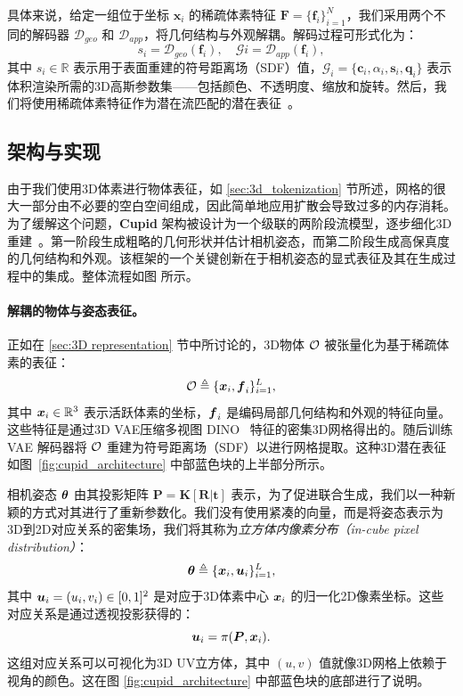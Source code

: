 \documentclass[../../book-main_zh.tex]{subfiles}
\begin{document}
具体来说，给定一组位于坐标 $\boldsymbol{x}_i$ 的稀疏体素特征 $\boldsymbol{F} = \{\boldsymbol{f}_i\}_{i=1}^N$，我们采用两个不同的解码器 $\mathcal{D}_{geo}$ 和 $\mathcal{D}_{app}$，将几何结构与外观解耦。解码过程可形式化为：
\begin{equation}
s_i = \mathcal{D}_{geo}(\boldsymbol{f}_i), \quad \mathcal{G}i = \mathcal{D}_{app}(\boldsymbol{f}_i),
\end{equation}
其中 $s_i \in \mathbb{R}$ 表示用于表面重建的符号距离场（SDF）值，$\mathcal{G}_i = \{\boldsymbol{c}_i, \alpha_i, \boldsymbol{s}_i, \boldsymbol{q}_i\}$ 表示体积渲染所需的3D高斯参数集——包括颜色、不透明度、缩放和旋转。然后，我们将使用稀疏体素特征作为潜在流匹配的潜在表征~\citep{rombach2022high}。

\subsection{架构与实现}
\label{sub:3d_reconstruction_architecture}
由于我们使用3D体素进行物体表征，如 \ref{sec:3d_tokenization} 节所述，网格的很大一部分由不必要的空白空间组成，因此简单地应用扩散会导致过多的内存消耗。为了缓解这个问题，\textbf{Cupid} 架构被设计为一个级联的两阶段流模型，逐步细化3D重建~\citep{xiang2025structured}。第一阶段生成粗略的几何形状并估计相机姿态，而第二阶段生成高保真度的几何结构和外观。该框架的一个关键创新在于相机姿态的显式表征及其在生成过程中的集成。整体流程如图  所示。

\paragraph{解耦的物体与姿态表征。}

正如在 \ref{sec:3D representation} 节中所讨论的，3D物体 $\mathcal{O}$ 被张量化为基于稀疏体素的表征：
\begin{equation}
    \mathcal{O} \triangleq \{\boldsymbol{x}_i, \boldsymbol{f}_i\}_{i=1}^{L},
\end{equation}
其中 $\boldsymbol{x}_i \in \mathbb{R}^3$ 表示活跃体素的坐标，$\boldsymbol{f}_i$ 是编码局部几何结构和外观的特征向量。这些特征是通过3D VAE压缩多视图 DINO~\citep{oquab2023dinov2} 特征的密集3D网格得出的。随后训练 VAE 解码器将 $\mathcal{O}$ 重建为符号距离场（SDF）以进行网格提取。这种3D潜在表征如图~\ref{fig:cupid_architecture} 中部蓝色块的上半部分所示。

相机姿态 $\boldsymbol{\theta}$ 由其投影矩阵
$\boldsymbol{P} = \boldsymbol{K}[\boldsymbol{R}|\boldsymbol{t}]$ 表示，为了促进联合生成，我们以一种新颖的方式对其进行了重新参数化。我们没有使用紧凑的向量，而是将姿态表示为3D到2D对应关系的密集场，我们将其称为\textit{立方体内像素分布（in-cube pixel distribution）}：
\[
\boldsymbol{\theta} \triangleq \{\boldsymbol{x}_i, \boldsymbol{u}_i\}_{i=1}^{L},
\]
其中 $\boldsymbol{u}_i = (u_i, v_i) \in [0,1]^2$ 是对应于3D体素中心 $\boldsymbol{x}_i$ 的归一化2D像素坐标。这些对应关系是通过透视投影获得的：
\[
\boldsymbol{u}_i = \pi(\boldsymbol{P}, \boldsymbol{x}_i).
\]
这组对应关系可以可视化为3D UV立方体，其中 $(u,v)$ 值就像3D网格上依赖于视角的颜色。这在图 \ref{fig:cupid_architecture} 中部蓝色块的底部进行了说明。
\end{document}
